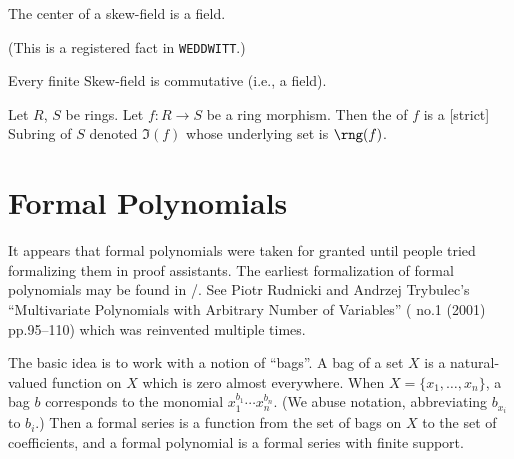 \begin{theorem}
The center of a skew-field is a field.
\end{theorem}

(This is a registered fact in \texttt{WEDDWITT}.)

\begin{theorem}
Every finite Skew-field is commutative (i.e., a field).
\end{theorem}

\begin{definition}
Let $R$, $S$ be rings. Let $f\colon R\to S$ be a ring morphism.
Then the  of $f$ is a [strict] Subring of $S$ denoted $\Im(f)$
whose underlying set is $\rng(f)$.
\end{definition}

\section{Formal Polynomials}

\begin{remark}
It appears that formal polynomials were taken for granted until people
tried formalizing them in proof assistants. The earliest formalization
of formal polynomials may be found in \Mizar/. See Piotr Rudnicki
and Andrzej Trybulec's ``Multivariate Polynomials with Arbitrary
Number of Variables'' (
no.1 (2001) pp.95--110) which was reinvented multiple times.\nocite{rudnicki2001multivariate}

The basic idea is to work with a notion of ``bags''. A bag of a set
$X$ is a natural-valued function on $X$ which is zero almost everywhere.
When $X=\{x_{1},\dots,x_{n}\}$, a bag $b$ corresponds to the monomial
$x_{1}^{b_{1}}\cdots x_{n}^{b_{n}}$. (We abuse notation, abbreviating
$b_{x_{i}}$ to $b_{i}$.) Then a formal series is a
function from the set of bags on $X$ to the set of coefficients, and a
formal polynomial is a formal series with finite support.
\end{remark}

